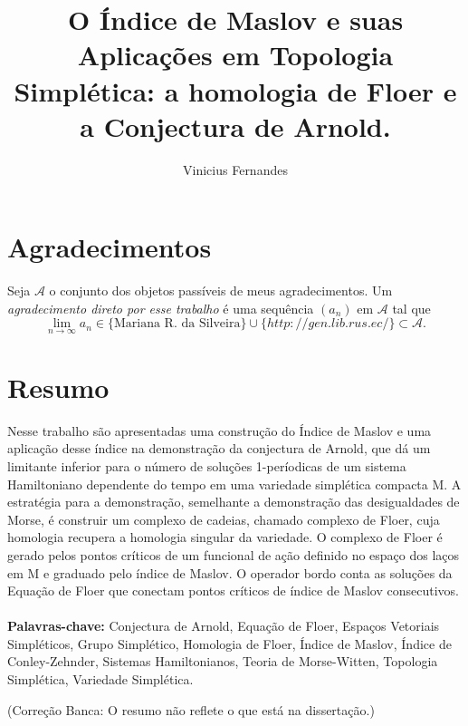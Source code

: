 \documentclass[12pt]{book}
\newcommand{\alerta}[1]{{\color{red}#1}}
\newcommand{\correcaobanca}[1]{\alerta{(Correção Banca: #1)}}
\begin{document}
	
	\title{O Índice de Maslov e suas Aplicações em Topologia Simplética: a homologia de Floer e a Conjectura de Arnold.}
	
	\author{Vinicius Fernandes}
	
	\maketitle
	
	\tableofcontents
	\chapter*{Agradecimentos}
	Seja $\mathcal{A}$ o conjunto dos objetos passíveis de meus agradecimentos. Um \textit{agradecimento direto por esse trabalho} é uma sequência $(a_{n})$ em $\mathcal{A}$ tal que
	$$
	\lim\limits_{n\to \infty} a_{n} \in \{\text{Mariana R. da Silveira}\} \cup \{http://gen.lib.rus.ec/ \} \subset \mathcal{A}.
	$$
	
	
	\chapter*{Resumo}
	Nesse trabalho são apresentadas uma construção do Índice de Maslov e uma aplicação desse índice na demonstração da conjectura de Arnold, que dá um limitante inferior para o número de soluções 1-períodicas de um sistema  Hamiltoniano dependente do tempo em uma variedade simplética compacta M. A estratégia para a demonstração, semelhante a demonstração das desigualdades de Morse, é construir um complexo de cadeias, chamado complexo de Floer, cuja homologia recupera a homologia singular da variedade. O complexo de Floer é gerado pelos pontos críticos de um funcional de ação definido no espaço dos laços em M e graduado pelo índice de Maslov. O operador bordo conta as soluções da Equação de Floer que conectam pontos críticos de índice de Maslov consecutivos.
	\\
	\\	
	\textbf{Palavras-chave:} Conjectura de Arnold, Equação de Floer, Espaços Vetoriais Simpléticos, Grupo Simplético, Homologia de Floer, Índice de Maslov, Índice de Conley-Zehnder, Sistemas Hamiltonianos, Teoria de Morse-Witten, Topologia Simplética, Variedade Simplética.
	
	\correcaobanca{O resumo não reflete o que está na dissertação.}
	
\end{document}
